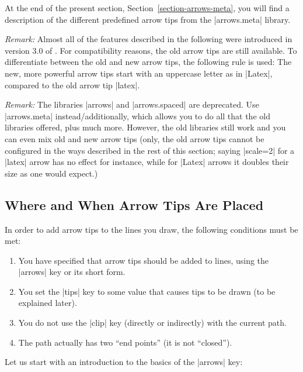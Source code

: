 At the end of the present section, Section~\ref{section-arrows-meta},
you will find a description of the different predefined arrow tips
from the |arrows.meta| library.

\emph{Remark:} Almost all of the features described in the following
were introduced in version 3.0 of \tikzname. For compatibility
reasons, the old arrow tips are still available. To differentiate
between the old and new arrow tips, the following rule is used: The
new, more powerful arrow tips start with an uppercase letter as in
|Latex|, compared to the old arrow tip |latex|.

\emph{Remark:} The libraries |arrows| and |arrows.spaced| are
deprecated. Use |arrows.meta| instead/additionally, which allows you
to do all that the old libraries offered, plus much more. However, the
old libraries still work and you can even mix old and new arrow tips
(only, the old arrow tips cannot be configured in the ways described
in the rest of this section; saying |scale=2| for a |latex| arrow has
no effect for instance, while for |Latex| arrows it doubles their size
as one would expect.)


\subsection{Where and When Arrow Tips Are Placed}
\label{section-arrow-tips-where}

In order to add arrow tips to the lines you draw, the following
conditions must be met:

\begin{enumerate}
\item You have specified that arrow tips should be added to 
  lines, using the |arrows| key or its short form.
\item You set the |tips| key to some value that causes tips to be
  drawn (to be explained later). 
\item You do not use the |clip| key (directly or indirectly) with the
  current path. 
\item The path actually has two ``end points'' (it is not
  ``closed'').
\end{enumerate}

Let us start with an introduction to the basics of the |arrows| key: 

